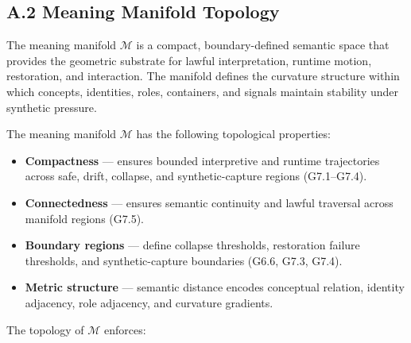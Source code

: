 
\subsection*{A.2 Meaning Manifold Topology}

\noindent The meaning manifold $\mathcal{M}$ is a compact, boundary-defined
semantic space that provides the geometric substrate for lawful interpretation,
runtime motion, restoration, and interaction. The manifold defines the curvature
structure within which concepts, identities, roles, containers, and signals
maintain stability under synthetic pressure.

\medskip

\noindent The meaning manifold $\mathcal{M}$ has the following topological
properties:

\begin{itemize}
    \item \textbf{Compactness} — ensures bounded interpretive and runtime
    trajectories across safe, drift, collapse, and synthetic-capture regions
    (G7.1--G7.4).

    \item \textbf{Connectedness} — ensures semantic continuity and lawful
    traversal across manifold regions (G7.5).

    \item \textbf{Boundary regions} — define collapse thresholds, restoration
    failure thresholds, and synthetic-capture boundaries (G6.6, G7.3, G7.4).

    \item \textbf{Metric structure} — semantic distance encodes conceptual
    relation, identity adjacency, role adjacency, and curvature gradients.
\end{itemize}

\medskip

\noindent The topology of $\mathcal{M}$ enforces:


